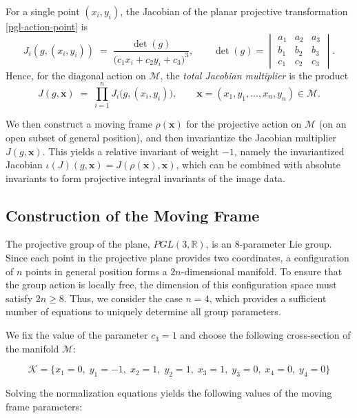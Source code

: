 \documentclass[12pt,reqno]{amsart}
\newcommand{\bs}{\boldsymbol}
\begin{document}
For a single point \((x_i,y_i)\), the Jacobian of the planar projective transformation \eqref{pgl-action-point} is
$$
J_i(g,(x_i,y_i))
\;=\;
\frac{\det(g)}{\bigl(c_1x_i+c_2y_i+c_3\bigr)^3},
\qquad
\det(g)=
\begin{vmatrix}
a_1 & a_2 & a_3 \\
b_1 & b_2 & b_3 \\
c_1 & c_2 & c_3
\end{vmatrix}.
$$
Hence, for the diagonal action on \(\mathcal M\), the \emph{total Jacobian multiplier} is the product
$$
J(g,\bs x)\;=\;\prod_{i=1}^n J_i\bigl(g,(x_i,y_i)\bigr),
\qquad
\bs x=(x_1,y_1,\dots,x_n,y_n)\in\mathcal M.
$$

We then construct a moving frame \(\rho(\bs x)\) for the projective action on \(\mathcal M\)
(on an open subset of general position), and then invariantize the Jacobian multiplier \(J(g,\bs x)\). This yields a relative invariant of weight \(-1\), namely the invariantized Jacobian
\(\iota(J)(g,\bs x)=J(\rho(\bs x),\bs x)\), which can be combined with absolute invariants
to form projective integral invariants of the image data.


\subsection{Construction of the Moving Frame}

The projective group of the plane, $PGL(3, \mathbb{R})$, is an 8-parameter Lie group. Since each point in the projective plane provides two coordinates, a configuration of $n$ points in general position forms a $2n$-dimensional manifold. To ensure that the group action is locally free, the dimension of this configuration space must satisfy $2n \geq 8$. Thus, we consider the case $n=4$, which provides a sufficient number of equations to uniquely determine all group parameters.

We fix the value of the parameter \(c_3 = 1\) and choose the following cross-section of the manifold \(\mathcal{M}\):

$$
\mathcal{K} = \{ x_1 = 0,\; y_1 = -1,\; x_2 = 1,\; y_2 = 1,\; x_3 = 1,\; y_3 = 0,\; x_4 = 0,\; y_4 = 0 \}
$$

Solving the normalization equations yields the following values of the moving frame parameters:
\end{document}
